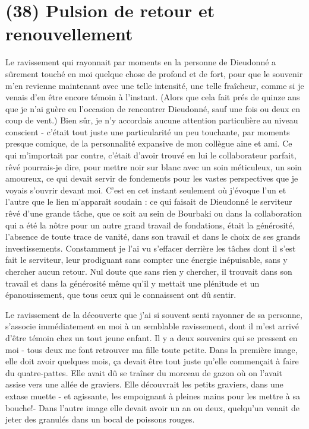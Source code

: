 \section{(38) Pulsion de retour et renouvellement}

Le ravissement qui rayonnait par moments en la personne de Dieudonné a sûrement touché en moi quelque chose de profond et de fort, pour que le souvenir m'en revienne maintenant avec une telle intensité, une telle fraîcheur, comme si je venais d'en être encore témoin à l'instant. (Alors que cela fait prés de quinze ans que je n'ai guère eu l'occasion de rencontrer Dieudonné, sauf une fois ou deux en coup de vent.) Bien sûr, je n'y accordais aucune attention particulière au niveau conscient - c'était tout juste une particularité un peu touchante, par moments presque comique, de la personnalité expansive de mon collègue aine et ami. Ce qui m'importait par contre, c'était d'avoir trouvé en lui le collaborateur parfait, rêvé pourrais-je dire, pour mettre noir sur blanc avec un soin méticuleux, un soin amoureux, ce qui devait servir de fondements pour les vastes perspectives que je voyais s'ouvrir devant moi. C'est en cet instant seulement où j'évoque l'un et l'autre que le lien m'apparaît soudain : ce qui faisait de Dieudonné le serviteur rêvé d'une grande tâche, que ce soit au sein de Bourbaki ou dans la collaboration qui a été la nôtre pour un autre grand travail de fondations, était la générosité, l'absence de toute trace de vanité, dans son travail et dans le choix de ses grands investissements. Constamment je l'ai vu s'effacer derrière les tâches dont il s'est fait le serviteur, leur prodiguant sans compter une énergie inépuisable, sans y chercher aucun retour. Nul doute que sans rien y chercher, il trouvait dans son travail et dans la générosité même qu'il y mettait une plénitude et un épanouissement, que tous ceux qui le connaissent ont dû sentir.

Le ravissement de la découverte que j'ai si souvent senti rayonner de sa personne, s'associe immédiatement en moi à un semblable ravissement, dont il m'est arrivé d'être témoin chez un tout jeune enfant. Il y a deux souvenirs qui se pressent en moi - tous deux me font retrouver ma fille toute petite. Dans la première image, elle doit avoir quelques mois, ça devait être tout juste qu'elle commençait à faire du quatre-pattes. Elle avait dû se traîner du morceau de gazon où on l'avait assise vers une allée de graviers. Elle découvrait les petits graviers, dans une extase muette - et agissante, les empoignant à pleines mains pour les mettre à sa bouche!- Dans l'autre image elle devait avoir un an ou deux, quelqu'un venait de jeter des granulés dans un bocal de poissons rouges. 

